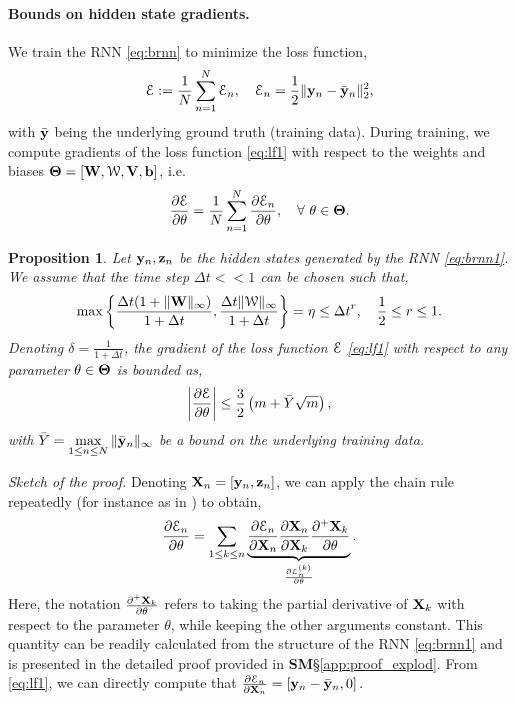 \documentclass{article} \usepackage{iclr2021_conference,times}
\newtheorem{proposition}[theorem]{Proposition}
\newcommand{\cW}{\EuScript{W}}
\newcommand{\by}{{\bf y}}
\newcommand{\bz}{{\bf z}}
\newcommand{\bW}{{\bf W}}
\newcommand{\bX}{{\bf X}}
\newcommand{\Dt}{{\Delta t}}
\newcommand{\E}{\EuScript{E}}
\begin{document}
\paragraph{Bounds on hidden state gradients.} We train the RNN \eqref{eq:brnn} to minimize the loss function,
\begin{equation}
\label{eq:lf1}
\E := \frac{1}{N}\sum\limits_{n=1}^N \E_n, \quad \E_n = \frac{1}{2} \|\by_n - \bar{\by}_n\|_2^2,
\end{equation}
with $\bar{\by}$ being the underlying ground truth (training data). During training, we compute gradients of the loss function \eqref{eq:lf1} with respect to the weights and biases $\bf \Theta = [W, \cW, V, b]$, i.e.
\begin{equation}
\label{eq:grad1}
\frac{\partial \E}{\partial \theta} = \frac{1}{N}\sum_{n=1}^N \frac{\partial \E_n}{\partial \theta}, \quad \forall ~\theta \in {\bf \Theta}.
\end{equation}
\begin{proposition}
\label{prop:3}
Let $\by_n,\bz_n$ be the hidden states generated by the RNN \eqref{eq:brnn1}. We assume that the time step $\Dt << 1$ can be chosen such that, 
\begin{equation}
\label{eq:assm}
\max \left\{ \frac{\Dt (1 + \|\bW\|_{\infty})}{1  + \Dt},  \frac{\Dt  \|{\bf \cW}\|_{\infty}}{1  + \Dt } \right \}  = \eta \leq \Dt^r, \quad \frac{1}{2} \leq r \leq 1.  
\end{equation}
Denoting $\delta = \frac{1}{1 + \Dt}$, the gradient of the loss function $\E$ \eqref{eq:lf1} with respect to any parameter $\theta \in {\bf \Theta}$ is bounded as,
\begin{equation}
    \label{eq:gbd}
    \left| \frac{\partial \E}{\partial \theta} \right| \leq \frac{3}{2}\left(m + \bar{Y} \sqrt{m}\right),
\end{equation}
with $\bar{Y} = \max\limits_{1 \leq n \leq N} \|\bar{\by}_n\|_{\infty}$ be a bound on the underlying training data.
\end{proposition}
\emph{Sketch of the proof.} Denoting $\bX_n = [\by_n, \bz_n]$, we can apply the chain rule repeatedly (for instance as in \cite{vanish_grad}) to obtain,
\begin{equation}
\label{eq:grad2}
\frac{\partial \E_n}{\partial \theta} = \sum\limits_{1 \leq k \leq n} \underbrace{\frac{\partial \E_n}{\partial \bX_n} \frac{\partial \bX_n}{\partial \bX_k} \frac{\partial^{+} \bX_k}{\partial \theta}}_{\frac{\partial \E^{(k)}_n}{\partial \theta}}.
\end{equation}
Here, the notation $\frac{\partial^{+} \bX_k}{\partial \theta}$ refers to taking the partial derivative of $\bX_k$ with respect to the parameter $\theta$, while keeping the other arguments constant. This quantity can be readily calculated from the structure of the RNN \eqref{eq:brnn1} and is presented in the detailed proof provided in {\bf SM}\S\ref{app:proof_explod}. From \eqref{eq:lf1}, we can directly compute that $\frac{\partial \E_n}{\partial \bX_n} = \left[\by_n - \bar{\by}_n, 0 \right].$ 
\end{document}
